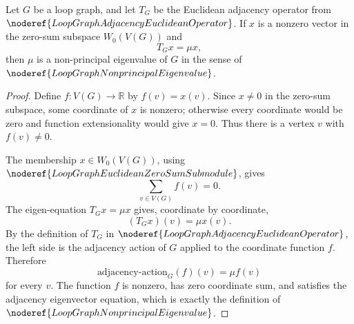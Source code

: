 \begin{helper}
Let \(G\) be a loop graph, and let \(T_G\) be the Euclidean adjacency operator
from \(\noderef{LoopGraphAdjacencyEuclideanOperator}\).  If \(x\) is a nonzero
vector in the zero-sum subspace \(W_0(V(G))\) and
\[
  T_Gx=\mu x,
\]
then \(\mu\) is a non-principal eigenvalue of \(G\) in the sense of
\(\noderef{LoopGraphNonprincipalEigenvalue}\).
\end{helper}
\begin{proof}
Define \(f\colon V(G)\to\mathbb R\) by \(f(v)=x(v)\).  Since \(x\neq 0\) in
the zero-sum subspace, some coordinate of \(x\) is nonzero; otherwise every
coordinate would be zero and function extensionality would give \(x=0\).  Thus
there is a vertex \(v\) with \(f(v)\neq 0\).

The membership \(x\in W_0(V(G))\), using
\(\noderef{LoopGraphEuclideanZeroSumSubmodule}\), gives
\[
  \sum_{v\in V(G)} f(v)=0.
\]
The eigen-equation \(T_Gx=\mu x\) gives, coordinate by coordinate,
\[
  (T_Gx)(v)=\mu x(v).
\]
By the definition of \(T_G\) in \(\noderef{LoopGraphAdjacencyEuclideanOperator}\),
the left side is the adjacency action of \(G\) applied to the coordinate
function \(f\).  Therefore
\[
  \text{adjacency-action}_G(f)(v)=\mu f(v)
\]
for every \(v\).  The function \(f\) is nonzero, has zero coordinate sum, and
satisfies the adjacency eigenvector equation, which is exactly the definition
of \(\noderef{LoopGraphNonprincipalEigenvalue}\).
\end{proof}

